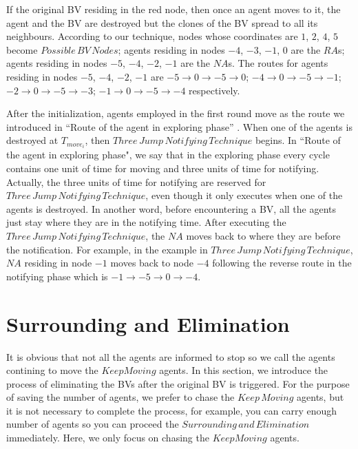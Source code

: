 If the original BV residing in the red node, then once an agent moves to it, the agent and the BV are destroyed but the clones of the BV spread to all its neighbours. According to our technique, nodes whose coordinates are $1$, $2$, $4$, $5$ become $Possible\,BV\,Nodes$; agents residing in nodes $-4$, $-3$, $-1$, $0$ are the $RA$s; agents residing in nodes $-5$, $-4$, $-2$, $-1$ are the $NA$s. The routes for agents residing in nodes $-5$, $-4$, $-2$, $-1$ are $-5{\rightarrow}0{\rightarrow}-5{\rightarrow}0$; $-4{\rightarrow}0{\rightarrow}-5{\rightarrow}-1$; $-2{\rightarrow}0{\rightarrow}-5{\rightarrow}-3$; $-1{\rightarrow}0{\rightarrow}-5{\rightarrow}-4$ respectively.\\


After the initialization, agents employed in the first round move as the route we introduced in ``Route of the agent in exploring phase'' . When one of the agents is destroyed at $T_{move_i}$, then $Three\,Jump\,Notifying\,Technique$ begins. In ``Route of the agent in exploring phase", we say that in the exploring phase every cycle contains one unit of time for moving and three units of time for notifying. Actually, the three units of time for notifying are reserved for $Three\,Jump\,Notifying\,Technique$, even though it only executes when one of the agents is destroyed. In another word, before encountering a BV, all the agents just stay where they are in the notifying time.
After executing the $Three\,Jump\,Notifying\,Technique$, the $NA$ moves back to where they are before the notification. For example, in the example in $Three\,Jump\,Notifying\,Technique$, $NA$ residing in node $-1$ moves back to node $-4$ following the reverse route in the notifying phase which is $-1{\rightarrow}-5{\rightarrow}0{\rightarrow}-4$. 

\section{Surrounding and Elimination}
It is obvious that not all the agents are informed to stop so we call the agents contining to move the $KeepMoving$ agents. In this section, we introduce the process of eliminating the BVs after the original BV is triggered. For the purpose of saving the number of agents, we prefer to chase the $Keep\,Moving$ agents, but it is not necessary to complete the process, for example, you can carry enough number of agents so you can proceed the $Surrounding\,and\,Elimination$ immediately. Here, we only focus on chasing the $KeepMoving$ agents.


